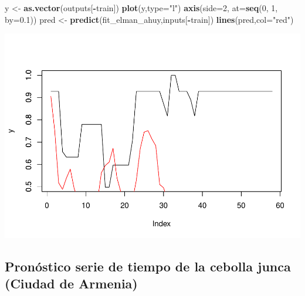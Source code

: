\documentclass[
]{book}
\newenvironment{Shaded}{\begin{snugshade}}{\end{snugshade}}
\newcommand{\AttributeTok}[1]{\textcolor[rgb]{0.13,0.29,0.53}{#1}}
\newcommand{\DecValTok}[1]{\textcolor[rgb]{0.00,0.00,0.81}{#1}}
\newcommand{\FloatTok}[1]{\textcolor[rgb]{0.00,0.00,0.81}{#1}}
\newcommand{\FunctionTok}[1]{\textcolor[rgb]{0.13,0.29,0.53}{\textbf{#1}}}
\newcommand{\NormalTok}[1]{#1}
\newcommand{\OtherTok}[1]{\textcolor[rgb]{0.56,0.35,0.01}{#1}}
\newcommand{\SpecialCharTok}[1]{\textcolor[rgb]{0.81,0.36,0.00}{\textbf{#1}}}
\newcommand{\StringTok}[1]{\textcolor[rgb]{0.31,0.60,0.02}{#1}}
\begin{document}
\begin{Shaded}
\begin{Highlighting}[]
\NormalTok{y }\OtherTok{\textless{}{-}} \FunctionTok{as.vector}\NormalTok{(outputs[}\SpecialCharTok{{-}}\NormalTok{train])}
\FunctionTok{plot}\NormalTok{(y,}\AttributeTok{type=}\StringTok{"l"}\NormalTok{)}
\FunctionTok{axis}\NormalTok{(}\AttributeTok{side=}\DecValTok{2}\NormalTok{, }\AttributeTok{at=}\FunctionTok{seq}\NormalTok{(}\DecValTok{0}\NormalTok{, }\DecValTok{1}\NormalTok{, }\AttributeTok{by=}\FloatTok{0.1}\NormalTok{))}
\NormalTok{pred }\OtherTok{\textless{}{-}} \FunctionTok{predict}\NormalTok{(fit\_elman\_ahuy,inputs[}\SpecialCharTok{{-}}\NormalTok{train])}
\FunctionTok{lines}\NormalTok{(pred,}\AttributeTok{col=}\StringTok{"red"}\NormalTok{)}
\end{Highlighting}
\end{Shaded}

\includegraphics{bookdown-demo_files/figure-latex/unnamed-chunk-189-1.pdf}

\hypertarget{pronuxf3stico-serie-de-tiempo-de-la-cebolla-junca-ciudad-de-armenia-3}{%
\subsection{Pronóstico serie de tiempo de la cebolla junca (Ciudad de Armenia)}\label{pronuxf3stico-serie-de-tiempo-de-la-cebolla-junca-ciudad-de-armenia-3}}
\end{document}
